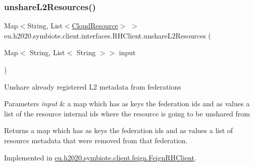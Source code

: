 \mbox{\label{interfaceeu_1_1h2020_1_1symbiote_1_1client_1_1interfaces_1_1RHClient_a0570ca0fb6285f0e9900429c93a83de3}} 
\subsubsection{\texorpdfstring{unshare\+L2\+Resources()}{unshareL2Resources()}}
{\footnotesize\ttfamily Map$<$String, List$<$\hyperlink{classeu_1_1h2020_1_1symbiote_1_1cloud_1_1model_1_1internal_1_1CloudResource}{Cloud\+Resource}$>$ $>$ eu.\+h2020.\+symbiote.\+client.\+interfaces.\+R\+H\+Client.\+unshare\+L2\+Resources (\begin{DoxyParamCaption}\item[{Map$<$ String, List$<$ String $>$$>$}]{input }\end{DoxyParamCaption})}

Unshare already registered L2 metadata from federations 
\begin{DoxyParams}{Parameters}
{\em input} & a map which has as keys the federation ids and as values a list of the resource internal ids where the resource is going to be unshared from \\
\hline
\end{DoxyParams}
\begin{DoxyReturn}{Returns}
a map which has as keys the federation ids and as values a list of resource metadata that were removed from that federation. 
\end{DoxyReturn}


Implemented in \hyperlink{classeu_1_1h2020_1_1symbiote_1_1client_1_1feign_1_1FeignRHClient_aaac584d86c2d5c63dbfe1a367fc3bd24}{eu.\+h2020.\+symbiote.\+client.\+feign.\+Feign\+R\+H\+Client}.

\mbox{\label{interfaceeu_1_1h2020_1_1symbiote_1_1client_1_1interfaces_1_1RHClient_a4428c0bb91f9433dae6a0ef98a696d11}} 
